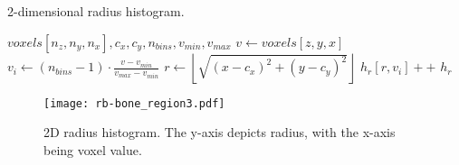 
\begin{algorithm}
    \caption{2-dimensional radius histogram.}
    \label{alg:2dhists}
    \begin{algorithmic}
         {$voxels[n_z,n_y,n_x],c_x,c_y,n_{bins},v_{min},v_{max}$}
                \State $v \gets voxels[z,y,x]$
                    \State $v_{i} \gets (n_{bins}-1) \cdot \frac{v - v_{min}}{v_{max} - v_{min}}$
                    \State $r \gets \left\lfloor\sqrt{(x-c_x)^2 + (y-c_y)^2}\right\rfloor$
                    \State $h_r[r,v_{i}]{+}{+}$
                \EndIf
            \EndFor
            \Return $h_r$
        \EndFunction
    \end{algorithmic}
\end{algorithm}

\begin{figure}
    \centering
    \texttt{[image: rb-bone\_region3.pdf]}
    \caption{2D radius histogram. The y-axis depicts radius, with the x-axis being voxel value.}
    \label{fig:2dhists}
\end{figure}

